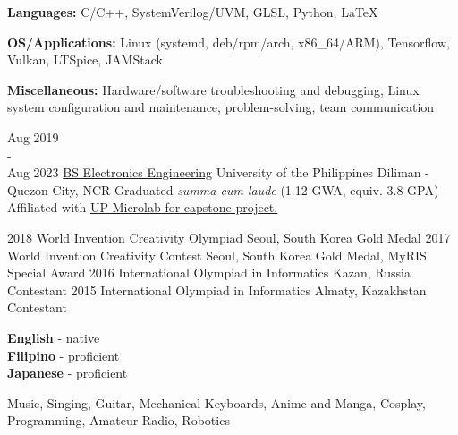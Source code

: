 \documentclass[9pt]{developercv}
\begin{document}
\begin{minipage}[t]{0.475\textwidth} 
	\vspace{-\baselineskip}


	\textbf{Languages:} C/C++, SystemVerilog/UVM, GLSL, Python, LaTeX

	\textbf{OS/Applications:} Linux (systemd, deb/rpm/arch, x86\_64/ARM), Tensorflow, Vulkan, LTSpice, JAMStack

	\textbf{Miscellaneous:} Hardware/software troubleshooting and debugging, Linux system configuration and maintenance, problem-solving, team communication

	
	\begin{entrylist}
		\entry
			{Aug 2019 \\ - \\ Aug 2023}
			{\href{https://www.eee.upd.edu.ph/undergraduate-programs/bs-electronics-and-communications-engineering}{BS Electronics Engineering}}
			{University of the Philippines Diliman - Quezon City, NCR}
			{Graduated \emph{summa cum laude} (1.12 GWA, equiv. 3.8 GPA)\\
			Affiliated with \href{https://www.up-microlab.org/}{UP Microlab for capstone project.}}
	\end{entrylist}
	\cvsect{Achievements}
	\begin{entrylist}
		\entry
			{2018}
			{World Invention Creativity Olympiad}
			{Seoul, South Korea}
			{Gold Medal}
		\entry
			{2017}
			{World Invention Creativity Contest}
			{Seoul, South Korea}
			{Gold Medal, MyRIS Special Award}
		\entry
			{2016}
			{International Olympiad in Informatics}
			{Kazan, Russia}
			{Contestant}
		\entry
			{2015}
			{International Olympiad in Informatics}
			{Almaty, Kazakhstan}
			{Contestant}
	\end{entrylist}
\end{minipage}

\vspace{0.5cm}

\begin{minipage}[t]{0.2\textwidth}
	\vspace{-\baselineskip}

	\textbf{English} - native\\
	\textbf{Filipino} - proficient\\
	\textbf{Japanese} - proficient\\
\end{minipage}
\hfill
\begin{minipage}[t]{0.6\textwidth}
	\vspace{-\baselineskip}
	
	Music, Singing, Guitar, Mechanical Keyboards, Anime and Manga, Cosplay, Programming, Amateur Radio, Robotics
\end{minipage}
\end{document}
